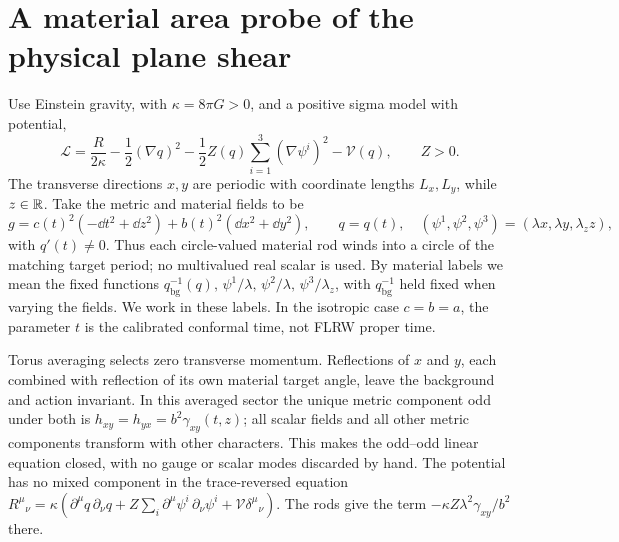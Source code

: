 \section{A material area probe of the physical plane shear}
\label{sec:material}

Use Einstein gravity, with \(\kappa=8\pi G>0\), and a positive sigma model with potential,
\begin{equation}
 \mathcal L=\frac{R}{2\kappa}
 -\frac12(\nabla q)^2-\frac12 Z(q)\sum_{i=1}^3(\nabla\psi^i)^2
 -\mathcal V(q),\qquad Z>0 .
 \label{eq:L}
\end{equation}
The transverse directions \(x,y\) are periodic with coordinate lengths \(L_x,L_y\), while \(z\in\mathbb R\). Take the metric and material fields to be
\begin{equation}
 g=c(t)^2(-\dd t^2+\dd z^2)+b(t)^2(\dd x^2+\dd y^2),\qquad
 q=q(t),\quad
 (\psi^1,\psi^2,\psi^3)=(\lambda x,\lambda y,\lambda_z z),
 \label{eq:metric}
\end{equation}
with \(q'(t)\ne0\). Thus each circle-valued material rod winds into a circle of the matching target period; no multivalued real scalar is used. By material labels we mean the fixed functions \(q_{\mathrm{bg}}^{-1}(q),\,\psi^1/\lambda,\,\psi^2/\lambda,\,\psi^3/\lambda_z\), with \(q_{\mathrm{bg}}^{-1}\) held fixed when varying the fields. We work in these labels. In the isotropic case \(c=b=a\), the parameter \(t\) is the calibrated conformal time, not FLRW proper time.

Torus averaging selects zero transverse momentum. Reflections of \(x\) and \(y\), each combined with reflection of its own material target angle, leave the background and action invariant. In this averaged sector the unique metric component odd under both is \(h_{xy}=h_{yx}=b^2\gamma_{xy}(t,z)\); all scalar fields and all other metric components transform with other characters. This makes the odd--odd linear equation closed, with no gauge or scalar modes discarded by hand. The potential has no mixed component in the trace-reversed equation \(R^\mu{}_\nu=\kappa(\partial^\mu q\,\partial_\nu q+Z\sum_i\partial^\mu\psi^i\,\partial_\nu\psi^i+\mathcal V\delta^\mu{}_\nu)\). The rods give the term \(-\kappa Z\lambda^2\gamma_{xy}/b^2\) there.

